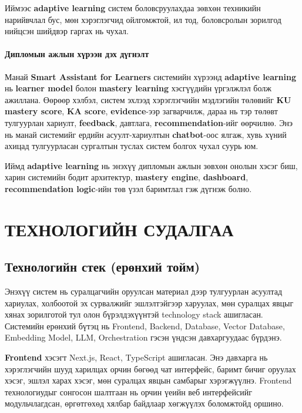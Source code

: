 \documentclass[12pt,A4]{report}
\newcommand{\eng}[1]{#1}
\begin{document}
Иймээс \textbf{adaptive learning} систем боловсруулахдаа зөвхөн техникийн нарийвчлал бус, мөн хэрэглэгчид ойлгомжтой, ил тод, боловсролын зорилгод нийцсэн шийдвэр гаргах нь чухал.

\subsubsection*{Дипломын ажлын хүрээн дэх дүгнэлт}

Манай \textbf{Smart Assistant for Learners} системийн хүрээнд \textbf{adaptive learning} нь \textbf{learner model} болон \textbf{mastery learning} хэсгүүдийн үргэлжлэл болж ажиллана. Өөрөөр хэлбэл, систем эхлээд хэрэглэгчийн мэдлэгийн төлөвийг \textbf{KU mastery score}, \textbf{KA score}, \textbf{evidence}-ээр загварчилж, дараа нь тэр төлөвт тулгуурлан хариулт, \textbf{feedback}, давтлага, \textbf{recommendation}-ийг өөрчилнө. Энэ нь манай системийг ердийн асуулт-хариултын \textbf{chatbot}-оос ялгаж, хувь хүний ахицад тулгуурласан сургалтын туслах систем болгох чухал суурь юм.

Иймд \textbf{adaptive learning} нь энэхүү дипломын ажлын зөвхөн онолын хэсэг биш, харин системийн бодит архитектур, \textbf{mastery engine}, \textbf{dashboard}, \textbf{recommendation logic}-ийн төв үзэл баримтлал гэж дүгнэж болно.

\chapter{ТЕХНОЛОГИЙН СУДАЛГАА}
\section{Технологийн стек (ерөнхий тойм)}

Энэхүү систем нь суралцагчийн оруулсан материал дээр тулгуурлан асуултад хариулах, холбоотой эх сурвалжийг эшлэлтэйгээр харуулах, мөн суралцах явцыг хянах зорилготой тул олон бүрэлдэхүүнтэй \eng{technology stack} ашигласан. Системийн ерөнхий бүтэц нь \eng{Frontend}, \eng{Backend}, \eng{Database}, \eng{Vector Database}, \eng{Embedding Model}, \eng{LLM}, \eng{Orchestration} гэсэн үндсэн давхаргуудаас бүрдэнэ.

\textbf{\eng{Frontend}} хэсэгт \eng{Next.js}, \eng{React}, \eng{TypeScript} ашигласан. Энэ давхарга нь хэрэглэгчийн шууд харилцах орчин бөгөөд чат интерфейс, баримт бичиг оруулах хэсэг, эшлэл харах хэсэг, мөн суралцах явцын самбарыг хэрэгжүүлнэ. \eng{Frontend} технологиудыг сонгосон шалтгаан нь орчин үеийн веб интерфейсийг модульчлагдсан, өргөтгөхөд хялбар байдлаар хөгжүүлэх боломжтойд оршино.
\end{document}

